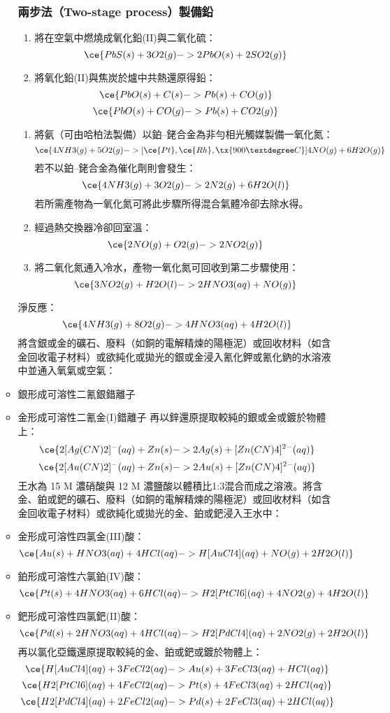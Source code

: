 \documentclass[a4paper,12pt]{report}
\begin{document}
\begin{itemize}
\begin{itemize}
\subsubsection{兩步法（Two-stage process）製備鉛}
\begin{enumerate}
\item 將在空氣中燃燒成氧化鉛(II)與二氧化硫：
\[\ce{PbS(s) + 3O2(g) -> 2PbO(s) + 2SO2(g)}\]
\item 將氧化鉛(II)與焦炭於爐中共熱還原得鉛：
\[\ce{PbO(s) + C(s) -> Pb(s) + CO(g)}\]
\[\ce{PbO(s) + CO(g) -> Pb(s) + CO2(g)}\]
\end{enumerate}
\begin{enumerate}
\item 將氨（可由哈柏法製備）以鉑–銠合金為非勻相光觸媒製備一氧化氮：
\[\ce{4NH3(g) + 5O2(g) ->[\ce{Pt}, \ce{Rh},\tx{900°C}] 4NO(g) + 6H2O(g)}\]
若不以鉑–銠合金為催化劑則會發生：
\[\ce{4NH3(g) + 3O2(g) -> 2N2(g) + 6H2O(l)}\]
若所需產物為一氧化氮可將此步驟所得混合氣體冷卻去除水得。
\item 經過熱交換器冷卻回室溫：
\[\ce{2NO(g) + O2(g) -> 2NO2(g)}\]
\item 將二氧化氮通入冷水，產物一氧化氮可回收到第二步驟使用：
\[\ce{3NO2(g) + H2O(l) -> 2HNO3(aq) + NO(g)}\]
\end{enumerate}
淨反應：
\[\ce{4NH3(g) + 8O2(g) -> 4HNO3(aq) + 4H2O(l)}\]
將含銀或金的礦石、廢料（如銅的電解精煉的陽極泥）或回收材料（如含金回收電子材料）或欲純化或拋光的銀或金浸入氰化鉀或氰化鈉的水溶液中並通入氧氣或空氣：
\bit
\item 銀形成可溶性二氰銀錯離子\ce{[Ag(CN)2]-}
\item 金形成可溶性二氰金(I)錯離子\ce{[Au(CN)2]-}
\eit
再以鋅還原提取較純的銀或金或鍍於物體上：
\[\ce{2[Ag(CN)2]^-(aq) + Zn(s) -> 2Ag(s) + [Zn(CN)4]^{2-}(aq)}\]
\[\ce{2[Au(CN)2]^-(aq) + Zn(s) -> 2Au(s) + [Zn(CN)4]^{2-}(aq)}\]
王水為 15 M 濃硝酸與 12 M 濃鹽酸以體積比1:3混合而成之溶液。將含金、鉑或鈀的礦石、廢料（如銅的電解精煉的陽極泥）或回收材料（如含金回收電子材料）或欲純化或拋光的金、鉑或鈀浸入王水中：
\bit
\item 金形成可溶性四氯金(III)酸：
\[\ce{Au(s) + HNO3(aq) + 4HCl(aq) -> H[AuCl4](aq) + NO(g) + 2H2O(l)}\]
\item 鉑形成可溶性六氯鉑(IV)酸：
\[\ce{Pt(s) + 4HNO3(aq) + 6HCl(aq) -> H2[PtCl6](aq) + 4NO2(g) + 4H2O(l)}\]
\item 鈀形成可溶性四氯鈀(II)酸：
\[\ce{Pd(s) + 2HNO3(aq) + 4HCl(aq) -> H2[PdCl4](aq) + 2NO2(g) + 2H2O(l)}\]
\eit
再以氯化亞鐵還原提取較純的金、鉑或鈀或鍍於物體上：
\[\ce{H[AuCl4](aq) + 3FeCl2(aq) -> Au(s) + 3FeCl3(aq) + HCl(aq)}\]
\[\ce{H2[PtCl6](aq) + 4FeCl2(aq) -> Pt(s) + 4FeCl3(aq) + 2HCl(aq)}\]
\[\ce{H2[PdCl4](aq) + 2FeCl2(aq) -> Pd(s) + 2FeCl3(aq) + 2HCl(aq)}\]

\end{itemize}
\end{itemize}
\end{document}
